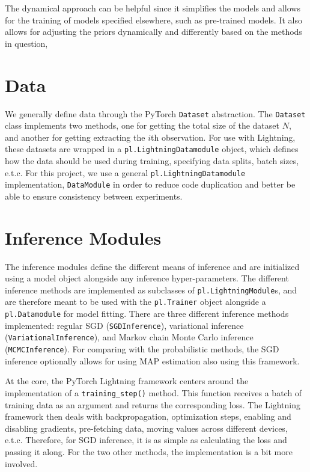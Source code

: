 The dynamical approach can be helpful since it simplifies the models and allows for the training of models specified elsewhere, such as pre-trained models. 
It also allows for adjusting the priors dynamically and differently based on the methods in question, 

\section{Data}
We generally define data through the PyTorch \texttt{Dataset} abstraction.
The \texttt{Dataset} class implements two methods, one for getting the total size of the dataset $N$, and another for getting extracting the $i$th observation.
For use with Lightning, these datasets are wrapped in a \texttt{pl.LightningDatamodule} object, which defines how the data should be used during training, specifying data splits, batch sizes, e.t.c.
For this project, we use a general \texttt{pl.LightningDatamodule} implementation, \texttt{DataModule} in order to reduce code duplication and better be able to ensure consistency between experiments. 

\section{Inference Modules}
The inference modules define the different means of inference and are initialized using a model object alongside any inference hyper-parameters.
The different inference methods are implemented as subclasses of \texttt{pl.LightningModule}s, and are therefore meant to be used with the \texttt{pl.Trainer} object alongside a \texttt{pl.Datamodule} for model fitting. 
There are three different inference methods implemented: regular SGD (\texttt{SGDInference}), variational inference (\texttt{VariationalInference}), and Markov chain Monte Carlo inference (\texttt{MCMCInference}).
For comparing with the probabilistic methods, the SGD inference optionally allows for using MAP estimation also using this framework.

At the core, the PyTorch Lightning framework centers around the implementation of a \texttt{training\_step()} method.
This function receives a batch of training data as an argument and returns the corresponding loss.
The Lightning framework then deals with backpropagation, optimization steps, enabling and disabling gradients, pre-fetching data, moving values across different devices, e.t.c.
Therefore, for SGD inference, it is as simple as calculating the loss and passing it along.
For the two other methods, the implementation is a bit more involved.

